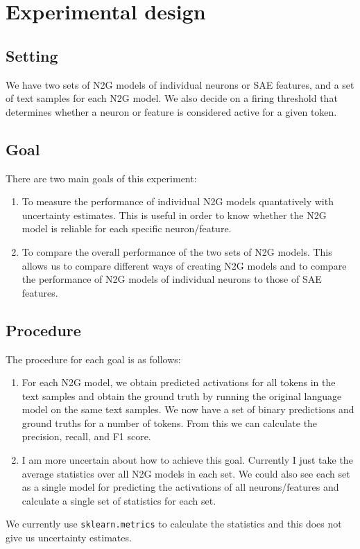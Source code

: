 \documentclass[main.tex]{subfiles}
\begin{document}
\section{Experimental design}
\subsection{Setting}
We have two sets of N2G models of individual neurons or SAE features, 
and a set of text samples for each N2G model.
We also decide on a firing threshold that determines 
whether a neuron or feature is considered active for a given token.
\subsection{Goal}
There are two main goals of this experiment:
\begin{enumerate}
    \item To measure the performance of individual N2G models 
    quantatively with uncertainty estimates.
    This is useful in order to know 
    whether the N2G model is reliable for each specific neuron/feature.
    \item To compare the overall performance of the two sets of N2G models.
    This allows us to compare different ways of creating N2G models 
    and to compare the performance of N2G models of individual neurons 
    to those of SAE features.
\end{enumerate}
\subsection{Procedure}
The procedure for each goal is as follows:
\begin{enumerate}
    \item For each N2G model, 
    we obtain predicted activations for all tokens in the text samples 
    and obtain the ground truth by running the original language model 
    on the same text samples.
    We now have a set of binary predictions and ground truths 
    for a number of tokens.
    From this we can calculate the precision, recall, and F1 score.
    \item I am more uncertain about how to achieve this goal.
    Currently I just take the average statistics over all N2G models 
    in each set.
    We could also see each set as a single model for predicting 
    the activations of all neurons/features 
    and calculate a single set of statistics for each set.
\end{enumerate}
We currently use \verb|sklearn.metrics| to calculate the statistics 
and this does not give us uncertainty estimates.
\end{document}
